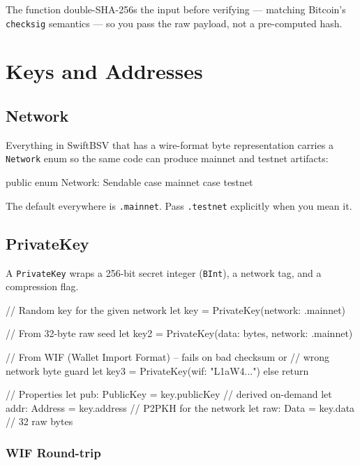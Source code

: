 \documentclass[a4paper, 11pt, openany]{book}
\begin{document}
The function double-SHA-256s the input before verifying --- matching Bitcoin's \texttt{checksig} semantics --- so you pass the raw payload, not a pre-computed hash.

\chapter{Keys and Addresses}

\section{Network}

Everything in SwiftBSV that has a wire-format byte representation carries a \texttt{Network} enum so the same code can produce mainnet and testnet artifacts:

\begin{forthbox}[Network]
public enum Network: Sendable {
    case mainnet
    case testnet
}
\end{forthbox}

The default everywhere is \texttt{.mainnet}. Pass \texttt{.testnet} explicitly when you mean it.

\section{PrivateKey}

A \texttt{PrivateKey} wraps a 256-bit secret integer (\texttt{BInt}), a network tag, and a compression flag.

\begin{forthbox}
// Random key for the given network
let key = PrivateKey(network: .mainnet)

// From 32-byte raw seed
let key2 = PrivateKey(data: bytes, network: .mainnet)

// From WIF (Wallet Import Format) -- fails on bad checksum or
// wrong network byte
guard let key3 = PrivateKey(wif: "L1aW4...") else { return }

// Properties
let pub: PublicKey = key.publicKey   // derived on-demand
let addr: Address = key.address      // P2PKH for the network
let raw: Data = key.data             // 32 raw bytes
\end{forthbox}

\subsection{WIF Round-trip}
\end{document}
